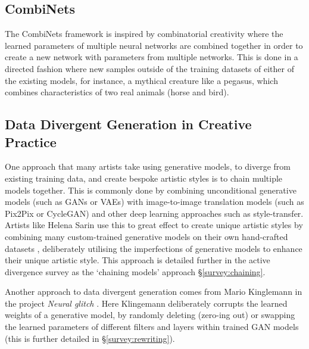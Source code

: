 \subsection{CombiNets}

The CombiNets framework \citep{guzdial2018combinets} is inspired by combinatorial creativity  \citep{boden2004creative} where the learned parameters of multiple neural networks are combined together in order to create a new network with parameters from multiple networks.
This is done in a directed fashion where new samples outside of the training datasets of either of the existing models, for instance, a mythical creature like a pegasus, which combines characteristics of two real animals (horse and bird).

\subsection{Data Divergent Generation in Creative Practice}
\label{c2:subsec:divergent-practice}

One approach that many artists take using generative models, to diverge from existing training data, and create bespoke artistic styles is to chain multiple models together. 
This is commonly done by combining unconditional generative models (such as GANs or VAEs) with image-to-image translation models (such as Pix2Pix or CycleGAN) and other deep learning approaches such as style-transfer.
Artists like Helena Sarin use this to great effect to create unique artistic styles by combining many custom-trained generative models on their own hand-crafted datasets \citep{sarin2018playing}, deliberately utilising the imperfections of generative models to enhance their unique artistic style. 
This approach is detailed further in the active divergence survey as the `chaining models' approach \S \ref{survey:chaining}.

Another approach to data divergent generation comes from Mario Kinglemann in the project \textit{Neural glitch} \citep{klingemann2018neural}. 
Here Klingemann deliberately corrupts the learned weights of a generative model, by randomly deleting (zero-ing out) or swapping the learned parameters of different filters and layers within trained GAN models (this is further detailed in \S \ref{survey:rewriting}). 

